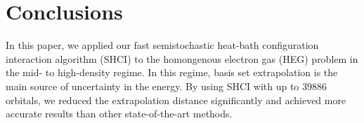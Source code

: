 \section{Conclusions}
In this paper, we applied our fast semistochastic heat-bath configuration interaction algorithm (SHCI) to the homongenous electron gas (HEG) problem in the mid- to high-density regime.
In this regime, basis set extrapolation is the main source of uncertainty in the energy.
By using SHCI with up to 39886 orbitals, we reduced the extrapolation distance significantly and achieved more accurate results than other state-of-the-art methods.

\label{conclusions}

